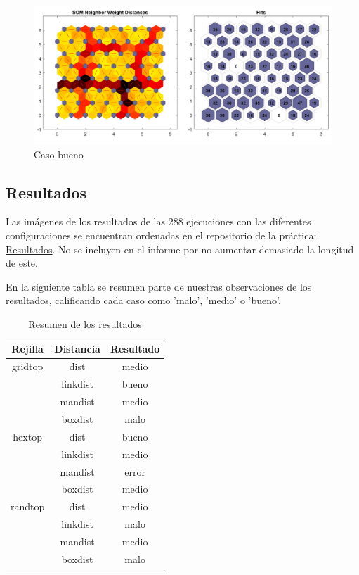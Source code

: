 \documentclass[a4paper,12pt,titlepage]{article}
\begin{document}
\begin{figure}[!ht]
	\centering
	\label{fig:patternnet}
	\includegraphics[width=\textwidth]{caso-bueno.jpg}
	\caption{Caso bueno}
\end{figure}

\subsection{Resultados}

Las imágenes de los resultados de las 288 ejecuciones con las diferentes configuraciones se encuentran ordenadas en el repositorio de la práctica: \href{https://github.com/davidmigloz/neuronal-networks/tree/master/P2\_SelfOrganizingMap/img}{Resultados}. No se incluyen en el informe por no aumentar demasiado la longitud de este.

En la siguiente tabla se resumen parte de nuestras observaciones de los resultados, calificando cada caso como 'malo', 'medio' o 'bueno'.

\begin{table}[!ht]
\centering
\begin{tabular}{*3c}
\toprule
Rejilla & Distancia & Resultado \\ 
\midrule
gridtop & dist & medio \\ 
        & linkdist & bueno \\ 
        & mandist & medio \\ 
	      & boxdist & malo \\ 
hextop & dist & bueno \\ 
       & linkdist & medio \\ 
	     & mandist & error \\ 
			 & boxdist & medio \\ 
randtop & dist & medio \\ 
   	 	  & linkdist & malo \\ 
				& mandist & medio \\ 
				& boxdist & malo \\ 
\bottomrule
\end{tabular} 
\caption{Resumen de los resultados}
\label{tab:results}
\end{table}
\end{document}

